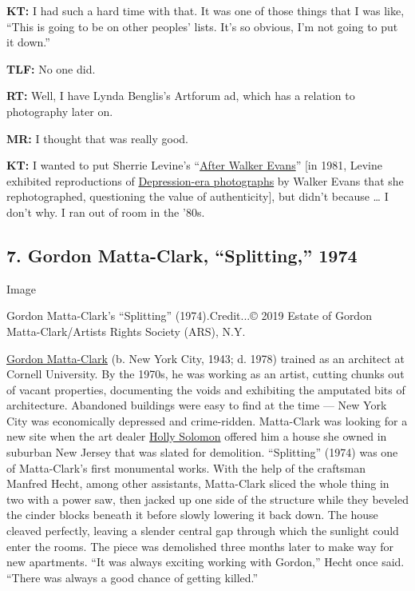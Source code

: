 \textbf{KT:} I had such a hard time with that. It was one of those
things that I was like, ``This is going to be on other peoples' lists.
It's so obvious, I'm not going to put it down.''

\textbf{TLF:} No one did.

\textbf{RT:} Well, I have Lynda Benglis's Artforum ad, which has a
relation to photography later on.

\textbf{MR:} I thought that was really good.

\textbf{KT:} I wanted to put Sherrie Levine's
``\href{http://www.afterwalkerevans.com/}{After Walker Evans}'' {[}in
1981, Levine exhibited reproductions of
\href{https://lens.blogs.nytimes.com/2013/08/08/a-new-look-at-walk-evanss-american-photographs/}{Depression-era
photographs} by Walker Evans that she rephotographed, questioning the
value of authenticity{]}, but didn't because \ldots{} I don't why. I ran
out of room in the '80s.

\hypertarget{7-gordon-matta-clark-splitting-1974}{%
\subsection{7. Gordon Matta-Clark, ``Splitting,''
1974}\label{7-gordon-matta-clark-splitting-1974}}

Image

Gordon Matta-Clark's ``Splitting'' (1974).Credit...© 2019 Estate of
Gordon Matta-Clark/Artists Rights Society (ARS), N.Y.

\href{https://www.davidzwirner.com/artists/gordon-matta-clark}{Gordon
Matta-Clark} (b. New York City, 1943; d. 1978) trained as an architect
at Cornell University. By the 1970s, he was working as an artist,
cutting chunks out of vacant properties, documenting the voids and
exhibiting the amputated bits of architecture. Abandoned buildings were
easy to find at the time --- New York City was economically depressed
and crime-ridden. Matta-Clark was looking for a new site when the art
dealer
\href{https://www.nytimes.com/2002/06/10/arts/holly-solomon-adventurous-art-dealer-is-dead-at-68.html}{Holly
Solomon} offered him a house she owned in suburban New Jersey that was
slated for demolition. ``Splitting'' (1974) was one of Matta-Clark's
first monumental works. With the help of the craftsman Manfred Hecht,
among other assistants, Matta-Clark sliced the whole thing in two with a
power saw, then jacked up one side of the structure while they beveled
the cinder blocks beneath it before slowly lowering it back down. The
house cleaved perfectly, leaving a slender central gap through which the
sunlight could enter the rooms. The piece was demolished three months
later to make way for new apartments. ``It was always exciting working
with Gordon,'' Hecht once said. ``There was always a good chance of
getting killed.''

